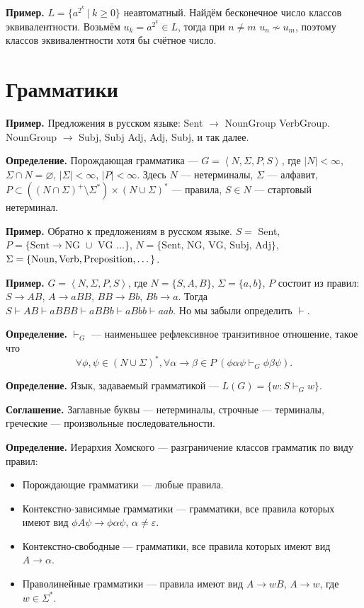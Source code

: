\textbf{Пример.} $L = \{a^{2^k}~|~k \ge 0\}$ неавтоматный. Найдём бесконечное число классов эквивалентности.
Возьмём $u_k = a^{2^k} \in L$, тогда при $n \ne m$ $u_n \not\sim u_m$, поэтому классов эквивалентности хотя бы счётное число.

\section{Грамматики}
\textbf{Пример.} Предложения в русском языке: Sent $\to$ NounGroup VerbGroup.
NounGroup $\to$ Subj, Subj Adj, Adj, Subj, и так далее.

\textbf{Определение.} Порождающая грамматика --- $G = \left<N, \Sigma, P, S \right>$, где $|N| < \infty$, $\Sigma \cap N = \varnothing$, $|\Sigma| < \infty$, $|P| < \infty$.
Здесь $N$ --- нетерминалы, $\Sigma$ --- алфавит, $P \subset ((N \cap \Sigma)^+ \setminus \Sigma^*) \times (N \cup \Sigma)^*$ --- правила, $S \in N$ --- стартовый нетерминал.

\textbf{Пример.} Обратно к предложениям в русском языке. $S = $ Sent, $P = \{\text{Sent} \to \text{NG $\cup$ VG $\dots$} \}$, $N = \{\text{Sent, NG, VG, Subj, Adj}\}$, $\Sigma = \{\text{Noun}, \text{Verb},\\ \text{Preposition}, \dots \}$.

\textbf{Пример.} $G = \left< N, \Sigma, P, S \right>$, где $N = \{S, A, B\}$, $\Sigma = \{a, b\}$, $P$ состоит из правил: $S \to AB$, $A \to aBB$, $BB \to Bb$, $Bb \to a$.
Тогда $S \vdash AB \vdash aBBB \vdash aBBb \vdash aBbb \vdash aab$.
Но мы забыли определить $\vdash$.

\textbf{Определение.} $\vdash_G$ --- наименьшее рефлексивное транзитивное отношение, такое что
\[
    \forall \phi, \psi \in (N \cup \Sigma)^*, \forall \alpha \to \beta \in P ~(\phi\alpha\psi \vdash_G \phi\beta\psi).
\]

\textbf{Определение.} Язык, задаваемый грамматикой --- $L(G) = \{w: S \vdash_G w\}$.

\textbf{Соглашение.} Заглавные буквы --- нетерминалы, строчные --- терминалы, греческие --- произвольные последовательности.

\textbf{Определение.} Иерархия Хомского --- разграничение классов грамматик по виду правил:
\begin{itemize}
    \item Порождающие грамматики --- любые правила.
    \item Контекстно-зависимые грамматики --- грамматики, все правила которых имеют вид $\phi A\psi \to \phi\alpha\psi$, $\alpha \ne \varepsilon$.
    \item Контекстно-свободные --- грамматики, все правила которых имеют вид $A \to \alpha$.
    \item Праволинейные грамматики --- правила имеют вид $A \to wB$, $A \to w$, где $w \in \Sigma^*$.
\end{itemize}

